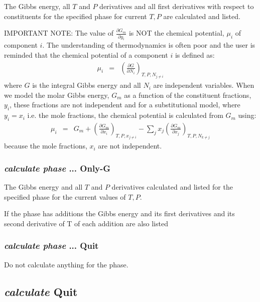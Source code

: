 \documentclass[11pt]{article}
\begin{document}
The Gibbs energy, all $T$ and $P$ derivatives and all first derivatives
with respect to constituents for the specified phase for current $T,P$
are calculated and listed.

IMPORTANT NOTE: The value of $\frac{\partial G_m}{\partial y_i}$ is
NOT the chemical potential, $\mu_i$ of component $i$.  The
understanding of thermodynamics is often poor and the user is reminded
that the chemical potential of a component $i$ is defined as:
\begin{eqnarray*}
\mu_i &=& \left(\frac{\partial G}{\partial N_i}\right)_{T,P,N_{j\ne i}}
\end{eqnarray*}
where $G$ is the integral Gibbs energy and all $N_i$ are independent
variables.  When we model the molar Gibbs energy, $G_m$ as a function
of the constituent fractions, $y_i$, these fractions are not
independent and for a substitutional model, where $y_i=x_i$ i.e. the
mole fractions, the chemical potential is calculated from $G_m$ using:
\begin{eqnarray*}
  \mu_i &=& G_m + \left(\frac{\partial G_m}{\partial x_i}\right)_{T,P,x_{j\ne i}}
  - \sum_j x_j \left(\frac{\partial G_m}{\partial x_j}\right)_{T,P,N_{k\ne j}}
\end{eqnarray*}
because the mole fractions, $x_i$ are not independent.

\hypertarget{calculate phase ... only-G}{}
\subsubsection{{\em calculate phase} ... Only-G}

The Gibbs energy and all $T$ and $P$ derivatives calculated and listed for
the specified phase for the current values of $T,P$.

If the phase has additions the Gibbs energy and its first derivatives
and its second derivative of T of each addition are also listed

\hypertarget{Calculate phase ... quit}{}
\subsubsection{{\em calculate phase} ... Quit}

Do not calculate anything for the phase.

\hypertarget{Calculate quit}{}
\subsection{{\em calculate} Quit}
\end{document}
